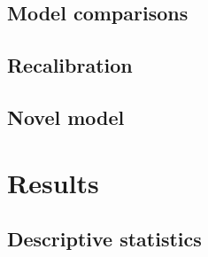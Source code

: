 \documentclass[onecolumn]{article}
\begin{document}



\subsection{Model comparisons}


\subsection{Recalibration}


\subsection{Novel model}



\section{Results}


\subsection{Descriptive statistics}

\end{document}
